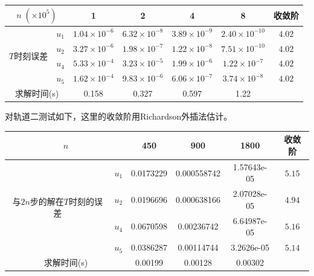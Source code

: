 \documentclass[lang=cn,10pt,bibend=bibtex]{elegantbook}
\begin{document}
\vspace{-.5em}
\begin{table}[htbp]
  \centering
  \renewcommand\arraystretch{1.1}
  \begin{tabular}{cc|cccc|c}
  \multicolumn{2}{c|}{$n\;(\times 10^5)$}                  & 1 & 2 & 4 & 8  & 收敛阶 \\ \hline
  \multicolumn{1}{c|}{\multirow{4}{*}{$T$时刻误差}} & \multicolumn{1}{c|}{$u_1$} &  $1.04\times 10^{-6}$  & $6.32\times 10^{-8}$  & $3.89\times 10^{-9}$  & $2.40\times 10^{-10}$    &  $4.02$   \\
  \multicolumn{1}{c|}{}                         & \multicolumn{1}{c|}{$u_2$} &  $3.27\times 10^{-6}$     & $1.98\times 10^{-7}$  & $1.22\times 10^{-8}$  & $7.51\times 10^{-10}$    &  $4.02$   \\
  \multicolumn{1}{c|}{}                         & \multicolumn{1}{c|}{$u_4$} &  $5.33\times 10^{-4}$     & $3.23\times 10^{-5}$  & $1.99\times 10^{-6}$  & $1.22\times 10^{-7}$     &  $4.02$   \\
  \multicolumn{1}{c|}{}                         & \multicolumn{1}{c|}{$u_5$} &  $1.62\times 10^{-4}$     & $9.83\times 10^{-6}$  & $6.06\times 10^{-7}$  & $3.74\times 10^{-8}$     &  $4.02$  \\ \hline
  \multicolumn{2}{c|}{求解时间(s)} & 0.158 & 0.327 & 0.597 & 1.22 & 
  \end{tabular}
\end{table}
\vspace{-.5em}

对轨道二测试如下，这里的收敛阶用Richardson外插法估计。

\vspace{-.5em}
\begin{table}[htbp]
  \centering
  \renewcommand\arraystretch{1.1}
  \begin{tabular}{cc|ccc|c}
  \multicolumn{2}{c|}{$n$}                         & 450 & 900 & 1800 & 收敛阶 \\ \hline
  \multicolumn{1}{c|}{\multirow{4}{*}{与$2n$步的解在$T$时刻的误差}}    & \multicolumn{1}{c|}{$u_1$} & 0.0173229  & 0.000558742  & 1.57643e-05  & $5.15$  \\
  \multicolumn{1}{c|}{}                         & \multicolumn{1}{c|}{$u_2$} &  0.0196696    &  0.000638166  & 2.07028e-05  & $4.94$   \\
  \multicolumn{1}{c|}{}                         & \multicolumn{1}{c|}{$u_4$} &  0.0670598     & 0.00236742  & 6.64987e-05  & $5.16$ \\
  \multicolumn{1}{c|}{}                         & \multicolumn{1}{c|}{$u_5$} &  0.0386287     & 0.00114744  & 3.2626e-05  & $5.14$  \\ \hline
  \multicolumn{2}{c|}{求解时间(s)} & 0.00199 & 0.00128 & 0.00302 &   
  \end{tabular}
\end{table}
\vspace{-.5em}
\end{document}
